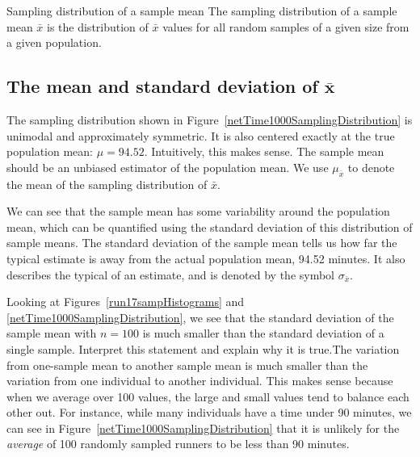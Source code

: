 \begin{onebox}{Sampling distribution of a sample mean}
The sampling distribution of a sample mean $\bar{x}$ is the distribution of  $\bar{x}$ values for all random samples of a given size from a given population. 
\end{onebox}


\subsection[The mean and standard deviation of $\bar{x}$]{The mean and standard deviation of $\pmb{\bar{x}}$}

The sampling distribution shown in Figure~\ref{netTime1000SamplingDistribution} is unimodal and approximately symmetric. It is also centered exactly at the true population mean: $\mu=94.52$. Intuitively, this makes sense. The sample mean should be an unbiased estimator of the population mean.  We use $\mu_{\bar{x}}$ to denote the mean of the sampling distribution of $\bar{x}$.  


We can see that the sample mean has some variability around the population mean, which can be quantified using the standard deviation of this distribution of sample means. The standard deviation of the sample mean tells us how far the typical estimate is away from the actual population mean, 94.52 minutes. It also describes the typical  of an estimate, and is denoted by the symbol $\sigma_{\bar{x}}$. 


\begin{examplewrap}
\begin{nexample}{Looking at Figures~\ref{run17sampHistograms} and \ref{netTime1000SamplingDistribution}, we see that the standard deviation of the sample mean with $n=100$ is much smaller than the standard deviation of a single sample. Interpret this statement and explain why it is true.}The variation from one-sample mean to another sample mean is much smaller than the variation from one individual to another individual. This makes sense because when we average over 100 values, the large and small values tend to balance each other out. For instance, while many individuals have a time under 90 minutes, we can see in Figure~\ref{netTime1000SamplingDistribution} that it is unlikely for the \emph{average} of 100 randomly sampled runners to be less than 90 minutes.
\end{nexample}
\end{examplewrap}

